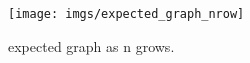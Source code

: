 \begin{figure}[!h]
{
\centering
    \texttt{[image: imgs/expected\_graph\_nrow]}
    \caption{expected graph as n grows.}
    \label{fig:expected_graph_nrows}
}
\end{figure}